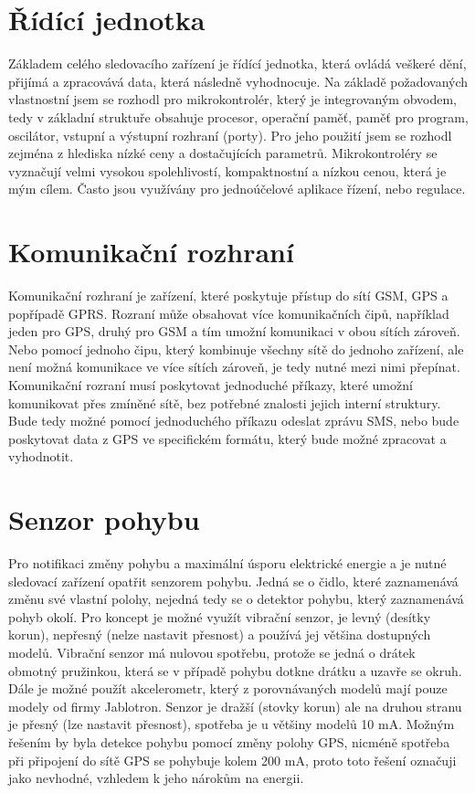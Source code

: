 \documentclass[FM,BP]{tulthesis}  %
\begin{document}
\section{Řídící jednotka}
Základem celého sledovacího zařízení je řídící jednotka, která ovládá veškeré dění, přijímá a zpracovává data, která následně vyhodnocuje. Na základě požadovaných vlastnostní jsem se rozhodl pro mikrokontrolér, který je integrovaným obvodem, tedy v základní struktuře obsahuje procesor, operační paměť, paměť pro program, oscilátor, vstupní a výstupní rozhraní (porty). Pro jeho použití jsem se rozhodl zejména z hlediska nízké ceny a dostačujících parametrů. Mikrokontroléry se vyznačují velmi vysokou spolehlivostí, kompaktnostní a nízkou cenou, která je mým cílem. Často jsou využívány pro jednoúčelové aplikace řízení, nebo regulace.

\section{Komunikační rozhraní}
Komunikační rozhraní je zařízení, které poskytuje přístup do sítí GSM, GPS a popřípadě GPRS. Rozraní může obsahovat více komunikačních čipů, například jeden pro GPS, druhý pro GSM a tím umožní komunikaci v obou sítích zároveň. Nebo pomocí jednoho čipu, který kombinuje všechny sítě do jednoho zařízení, ale není možná komunikace ve více sítích zároveň, je tedy nutné mezi nimi přepínat. Komunikační rozraní musí poskytovat jednoduché příkazy, které umožní komunikovat přes zmíněné sítě, bez potřebné znalosti jejich interní struktury. Bude tedy možné pomocí jednoduchého příkazu odeslat zprávu SMS, nebo bude poskytovat data z GPS ve specifickém formátu, který bude možné zpracovat a vyhodnotit.

\section{Senzor pohybu}
Pro notifikaci změny pohybu a maximální úsporu elektrické energie a je nutné sledovací zařízení opatřit senzorem pohybu. Jedná se o čidlo, které zaznamenává změnu své vlastní polohy, nejedná tedy se o detektor pohybu, který zaznamenává pohyb okolí. Pro koncept je možné využít vibrační senzor, je levný (desítky korun), nepřesný (nelze nastavit přesnost) a používá jej většina dostupných modelů. Vibrační senzor má nulovou spotřebu, protože se jedná o drátek obmotný pružinkou, která se v případě pohybu dotkne drátku a uzavře se okruh. Dále je možné použít akcelerometr, který z porovnávaných modelů mají pouze modely od firmy Jablotron. Senzor je dražší (stovky korun) ale na druhou stranu je přesný (lze nastavit přesnost), spotřeba je u většiny modelů 10 mA. Možným řešením by byla detekce pohybu pomocí změny polohy GPS, nicméně spotřeba při připojení do sítě GPS se pohybuje kolem 200 mA, proto toto řešení označuji jako nevhodné, vzhledem k jeho nárokům na energii.
\end{document}
